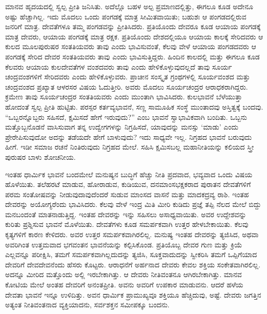 ಮಾನವ ಹೃದಯದಲ್ಲಿ ಸ್ವಲ್ಪ ಪ್ರೀತಿ ಜನಿಸಿತು. ಅದೆಲ್ಲೊ ಬಹಳ ಅಲ್ಪ ಪ್ರಮಾಣದಲ್ಲಿತ್ತು, ಈಗಲೂ ಕೂಡ ಅದೇನೂ ಅಷ್ಟು ಹೆಚ್ಚಾಗಿಲ್ಲ. ಇದು ಮೊದಲು ಒಂದು ಪಂಗಡಕ್ಕೆ ಮಾತ್ರ ಸೀಮಿತವಾಯಿತು; ಬಹುಶಃ ಆ ಪಂಗಡದಲ್ಲಿರುವ ಜನರಿಗೆ ಮಾತ್ರ. ದೇವತೆಗಳೂ ತಮ್ಮ ಪಂಗಡವನ್ನು ಪ್ರೀತಿಸಿದರು. ಪ್ರತಿಯೊಂದು ದೇವರೂ ಕೂಡ ಆಯಾಯ ಪಂಗಡಕ್ಕೆ ಮಾತ್ರ ದೇವರು, ಆಯಾಯ ಪಂಗಡಕ್ಕೆ ಮಾತ್ರ ರಕ್ಷಕ. ಪ್ರತಿಯೊಂದು ದೇಶದಲ್ಲಿಯೂ ಆಯಾಯ ಕಾಲಕ್ಕೆ ಸೇರಿದವರು ಆ ಕುಲದ ಮೂಲಪುರುಷರ ಸಂತತಿಯವರು ತಾವು ಎಂದು ಭಾವಿಸುವಂತೆ, ಕೆಲವು ವೇಳೆ ಆಯಾಯ ಪಂಗಡದವರು ಆ ಪಂಗಡಕ್ಕೆ ಸೇರಿದ ದೇವರ ಸಂತತಿಯವರು ತಾವು ಎಂದು ಭಾವಿಸುತ್ತಿದ್ದರು. ಹಿಂದಿನ ಕಾಲದಲ್ಲಿ ಮತ್ತು ಈಗಲೂ ಕೂಡ ಕೆಲವರು ಆಯಾಯ ಕುಲದೇವತೆಗಳ ವಂಶದವರು ತಾವು ಎಂದು ಹೇಳಿಕೊಳ್ಳುವುದಲ್ಲದೆ ತಾವು ಸೂರ್ಯ ಚಂದ್ರವಂಶಗಳಿಗೆ ಸೇರಿದವರು ಎಂದು ಹೇಳಿಕೊಳ್ಳುವರು. ಪ್ರಾಚೀನ ಸಂಸ್ಕೃತ ಗ್ರಂಥಗಳಲ್ಲಿ ಸೂರ್ಯವಂಶದ ಮತ್ತು ಚಂದ್ರವಂಶದ ಪ್ರಖ್ಯಾತ ಆಳರಸರ ವಿಷಯ ಓದುತ್ತೀರಿ. ಅವರು ಮೊದಲು ಸೂರ್ಯಚಂದ್ರರ ಆರಾಧಕರಾಗಿದ್ದರು. ಕ್ರಮೇಣ ತಾವು ಸೂರ್ಯಚಂದ್ರರ ಸಂತತಿಯವರು ಎಂದು ಮುಂತಾಗಿ ಭಾವಿಸಿದರು. ಕುಲಭಾವನೆ ಬೆಳೆಯುತ್ತಾ ಹೋದಂತೆ ಸ್ವಲ್ಪ ಪ್ರೀತಿ ಹುಟ್ಟಿತು. ಪರಸ್ಪರ ಕರ್ತವ್ಯಭಾವನೆ, ಸಣ್ಣ ಸಾಮೂಹಿಕ ಸಂಸ್ಥೆ ಮುಂತಾದವು ಅಸ್ತಿತ್ವಕ್ಕೆ ಬಂದವು. “ಒಬ್ಬರನ್ನೊಬ್ಬರು ಸಹಿಸದೆ, ಕ್ಷಮಿಸದೆ ಹೇಗೆ ಇರುವುದು?” ಎಂಬ ಭಾವನೆ ಸ್ವಾಭಾವಿಕವಾಗಿ ಬಂದಿತು. ಒಬ್ಬನು ಮತ್ತೊಬ್ಬನೊಡನೆ ವಾಸಿಸುವಾಗ ತನ್ನ ಉದ್ವೇಗಗಳನ್ನು ನಿಗ್ರಹಿಸದೆ, ಯಾವುದನ್ನು ಮನಸ್ಸು ‘ಮಾಡು’ ಎಂದು ಪ್ರೇರೇಪಿಸುವುದೋ ಅದನ್ನು ತಡೆಯದೇ ಹೇಗೆ ಬಾಳುವುದು? ಇದು ಸಾಧ್ಯವೇ ಇಲ್ಲ. ನಿಗ್ರಹದ ಭಾವನೆ ಬರುವುದು ಹೀಗೆ. ಇಡೀ ಸಮಾಜ ರಚನೆ ನಿಂತಿರುವುದು ನಿಗ್ರಹದ ಮೇಲೆ. ಸಹಿಸಿ ಕ್ಷಮಿಸಬಲ್ಲ ಮಹಾನೀತಿಯನ್ನು ಕಲಿಯದ ಸ್ತ್ರೀ ಪುರುಷರ ಬಾಳು ಶೋಚನೀಯ.

ಇಂತಹ ಧಾರ್ಮಿಕ ಭಾವನೆ ಬಂದಮೇಲೆ ಮನುಷ್ಯನ ಬುದ್ಧಿಗೆ ಹೆಚ್ಚು ನೀತಿ ಪ್ರದವಾದ, ಭವ್ಯವಾದ ಒಂದು ವಿಷಯ ಹೊಳೆಯಿತು. ತಲೆಹರಟೆ ಮಾಡುವ, ಹೋರಾಡುವ, ಕುಡಿಯುವ, ದನಮಾಂಸಭಕ್ಷಕರಾದ ಪುರಾತನ ದೇವತೆಗಳಿಗೆ ಪರಮ ಸಂತೋಷವನ್ನು ನೀಡುವುದಾವುದೆಂದರೆ ಸುಡುವ ಮಾಂಸದ ವಾಸನೆ ಮತ್ತು ಮಾದಕದ್ರವ್ಯ ರಾಶಿ. ಇಂತಹ ದೇವರನ್ನು ಅಯೋಗ್ಯರೆಂದು ಭಾವಿಸಿದರು. ಕೆಲವು ವೇಳೆ ಇಂದ್ರ ಮಿತಿ ಮೀರಿ ಕುಡಿದು ಪ್ರಜ್ಞೆ ತಪ್ಪಿ ನೆಲದ ಮೇಲೆ ಬಿದ್ದು ಮನಬಂದಂತೆ ಮಾತನಾಡುತ್ತಿದ್ದ. ಇಂತಹ ದೇವರನ್ನು ಇನ್ನು ಸಹಿಸಲು ಅಸಾಧ್ಯವಾಯಿತು. ಅವರ ಉದ್ದೇಶವನ್ನು ಕುರಿತು ಪ್ರಶ್ನಿಸುವ ಭಾವನೆ ಮೊಳೆಯಿತು. ದೇವತೆಗಳು ಕೂಡ ಸಮರ್ಪಕವಾಗಿ ಉತ್ತರ ಹೇಳಬೇಕಾಯಿತು. ಕೆಲವು ಕೃತ್ಯಗಳಿಗೆ ಕಾರಣ ಕೇಳಿದರು. ಅವರ ಉತ್ತರ ಸಮರ್ಪಕವಾಗಿರಲಿಲ್ಲ. ಮನುಷ್ಯ ಇಂತಹ ದೇವರನ್ನು ತ್ಯಜಿಸಿದ, ಅಥವಾ ಅವರಿಗಿಂತ ಉತ್ತಮವಾದ ಭಗವಂತನ ಭಾವನೆಯನ್ನು ಕಲ್ಪಿಸಿಕೊಂಡ. ಪ್ರತಿಯೊಬ್ಬ ದೇವರ ಗುಣ ಮತ್ತು ಕ್ರಿಯೆ ಎಲ್ಲವನ್ನೂ ಪರೀಕ್ಷಿಸಿ, ತಮಗೆ ಸಮರ್ಪಕವಾಗಿಲ್ಲದುದನ್ನು ತ್ಯಜಿಸಿ, ಸೂಕ್ತವಾದುದನ್ನು ಸ್ವೀಕರಿಸಿ ತಮಗೆ ಒಪ್ಪಿಗೆಯಾದ ದೇವರಿಗೆ ದೇವದೇವನೆಂದು ಹೆಸರು ಕೊಟ್ಟರು. ಆರಾಧನೆಗೆ ಅರ್ಹನಾದ ದೇವರು ಕೇವಲ ಶಕ್ತಿಯ ಸಂಕೇತವಾಗಿರಲಿಲ್ಲ. ಅದನ್ನೂ ಮೀರಿದ ಮತ್ತೊಂದು ಅಲ್ಲಿ ಇರಬೇಕಾಗಿತ್ತು. ಆ ದೇವರು ನೀತಿವಂತನೂ ಆಗಿರಬೇಕಾಗಿತ್ತು. ಮಾನವ ಕೋಟಿಯ ಮೇಲೆ ಅಂತಹ ದೇವರಿಗೆ ಅನಂತಪ್ರೀತಿ. ಅವನು ಅವರಿಗೆ ಉಪಕಾರ ಮಾಡುವನು. ಆದರೆ ಹಳೆಯ ದೇವತಾ ಭಾವನೆ ಇನ್ನೂ ಉಳಿದಿತ್ತು. ಅವನ ಧಾರ್ಮಿಕ ಪ್ರಾಮುಖ್ಯವೂ ಶಕ್ತಿಯೂ ಹೆಚ್ಚಿದುವು, ಅಷ್ಟೆ. ದೇವರು ಜಗತ್ತಿನ ಅತ್ಯಂತ ನೀತಿವಂತನಾದ ವ್ಯಕ್ತಿಯಾದನು, ಸರ್ವಶಕ್ತನ ಸಮೀಪಕ್ಕೂ ಬಂದನು.

